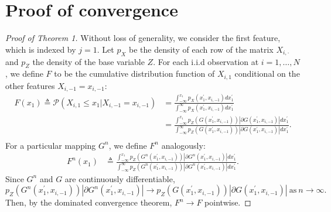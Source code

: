 \documentclass{article}
\begin{document}
\section{Proof of convergence}\label{sec:proof}
\asymptotic*
\begin{proof}[Proof of Theorem 1]
Without loss of generality, we consider the first feature, which is indexed by $j = 1$.
Let $p_X$ be the density of each row of the matrix $X_{i, \cdot}$ and $p_Z$ the density of the base variable $Z$.
For each i.i.d observation at $i=1, \dots, N$, we define $F$ to be the cumulative distribution function of $X_{i, 1}$ conditional on the other features $X_{i, -1} = x_{i, -1}$:
\begin{equation}
  \begin{split}
  F(x_{1}) \triangleq \mathcal P(X_{i, 1} \le x_{1} \vert X_{i,-1} = x_{i, -1}) &= \frac{\int_{-\infty}^{x_{1}} p_{X}(x^{\prime}_{1}, x_{i, -1}) d x^{\prime}_{1}} {\int_{-\infty}^{\infty} p_{X}(x^{\prime}_{1}, x_{i, -1}) d x^{\prime}_{1}} \\
  &= \frac{\int_{-\infty}^{x_{1}} p_{Z}(G(x^{\prime}_{1}, x_{i, -1})) |\partial G(x^{\prime}_{1}, x_{i, -1})| d x^{\prime}_{1}} {\int_{-\infty}^{\infty} p_{Z}(G(x^{\prime}_{1}, x_{i, -1})) |\partial G(x^{\prime}_{1}, x_{i, -1})| d x^{\prime}_{1}}. \\
\end{split}
\end{equation}
For a particular mapping $G^n$, we define $F^{n}$ analogously:
\begin{equation}
  \begin{split}
  F^{n} (x_{1})&\triangleq \frac{\int_{-\infty}^{x_{1}} p_{Z}(G^{n}(x^{\prime}_{1}, x_{i, -1})) |\partial G^{{n}}(x^{\prime}_{1}, x_{i, -1})| d x^{\prime}_{1}} {\int_{-\infty}^{\infty} p_{Z}(G^{{n}}(x^{\prime}_{1}, x_{i, -1})) |\partial G^{{n}}(x^{\prime}_{1}, x_{i, -1})| d x^{\prime}_{1}}.
\end{split}
\end{equation}
Since $G^{{n}}$ and $G$ are continuously differentiable,
\begin{equation}
p_{Z}(G^{n}(x^{\prime}_{1}, x_{i, -1})) |\partial G^{{n}}(x^{\prime}_{1}, x_{i, -1})| \to p_{Z}(G(x^{\prime}_{1}, x_{i, -1})) |\partial G(x^{\prime}_{1}, x_{i, -1})|~\text{as}~n\to\infty.
\end{equation}
Then, by the dominated convergence theorem, $F^{n} \to F$ pointwise.


\end{proof}
\end{document}
